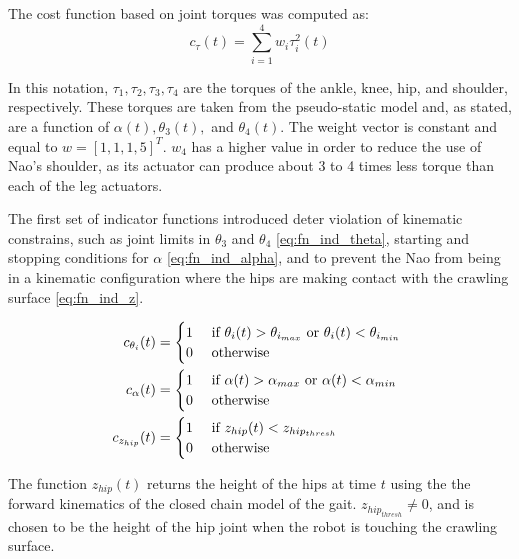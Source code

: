 The cost function based on joint torques was computed as:
\begin{equation}
	c_{\tau}(t) = \sum_{i=1}^4 w_i \tau_i^2(t) \label{eq:cost_joint}
\end{equation}

In this notation, $\tau_1, \tau_2, \tau_3, \tau_4$ are the torques of the ankle, knee, hip, and shoulder, respectively.
These torques are taken from the pseudo-static model and, as stated, are a function of 
$\alpha(t), \theta_3(t),$ and $\theta_4(t)$.
The weight vector is constant and equal to $w = [1, 1, 1, 5]^T$.
$w_4$ has a higher value in order to reduce the use of Nao's shoulder, as its actuator can produce about 3 to 4 times
less torque than each of the leg actuators.

The first set of indicator functions introduced deter violation of kinematic constrains, such as joint limits
in $\theta_3$ and $\theta_4$ \ref{eq:fn_ind_theta}, starting and stopping conditions for $\alpha$ \ref{eq:fn_ind_alpha},
and to prevent the Nao from being in a kinematic configuration where the hips are making contact with the crawling
surface \ref{eq:fn_ind_z}.

\begin{align}
	c_{\theta_i}(t) &=
  	\begin{cases} 
  		\hfill 1 \hfill & \text{ if $\theta_i (t) > \theta_{i_{max}}$ or $\theta_i (t) < \theta_{i_{min}}$ } \\
    	\hfill 0 \hfill & \text{ otherwise }
  	\end{cases} \label{eq:fn_ind_theta} \\
  c_{\alpha}(t) &=
  	\begin{cases} 
    	\hfill 1 \hfill & \text{ if $\alpha(t) > \alpha_{max}$ or $\alpha(t) < \alpha_{min}$ } \\
      \hfill 0 \hfill & \text{ otherwise }
  	\end{cases} \label{eq:fn_ind_alpha} \\
	c_{z_{hip}}(t) &=
  	\begin{cases} 
    	\hfill 1 \hfill & \text{ if $z_{hip}(t) < z_{hip_{thresh}}$ } \\
      \hfill 0 \hfill & \text{ otherwise }
  	\end{cases} \label{eq:fn_ind_z}
\end{align}

The function $z_{hip}(t)$ returns the height of the hips at time $t$ using the the forward kinematics of the
closed chain model of the gait. $z_{hip_{thresh}} \ne 0$, and is chosen to be the height of the hip joint when
the robot is touching the crawling surface.

